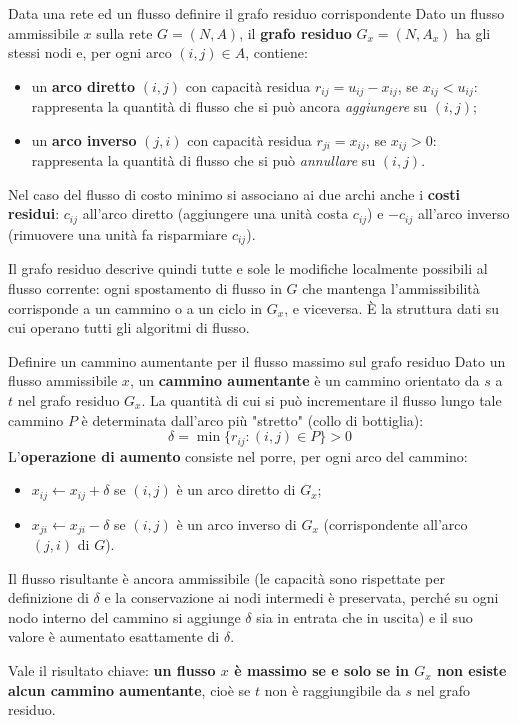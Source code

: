 \documentclass[12pt]{extarticle} %
\begin{document}
\begin{teoriabox}{Data una rete ed un flusso definire il grafo residuo corrispondente}
Dato un flusso ammissibile $x$ sulla rete $G=(N,A)$, il \textbf{grafo residuo} $G_x = (N, A_x)$ ha gli stessi nodi e, per ogni arco $(i,j) \in A$, contiene:
\begin{itemize}
    \item un \textbf{arco diretto} $(i,j)$ con capacità residua $r_{ij} = u_{ij} - x_{ij}$, se $x_{ij} < u_{ij}$: rappresenta la quantità di flusso che si può ancora \textit{aggiungere} su $(i,j)$;
    \item un \textbf{arco inverso} $(j,i)$ con capacità residua $r_{ji} = x_{ij}$, se $x_{ij} > 0$: rappresenta la quantità di flusso che si può \textit{annullare} su $(i,j)$.
\end{itemize}
Nel caso del flusso di costo minimo si associano ai due archi anche i \textbf{costi residui}: $c_{ij}$ all'arco diretto (aggiungere una unità costa $c_{ij}$) e $-c_{ij}$ all'arco inverso (rimuovere una unità fa risparmiare $c_{ij}$).

\noindent Il grafo residuo descrive quindi tutte e sole le modifiche localmente possibili al flusso corrente: ogni spostamento di flusso in $G$ che mantenga l'ammissibilità corrisponde a un cammino o a un ciclo in $G_x$, e viceversa. È la struttura dati su cui operano tutti gli algoritmi di flusso.
\end{teoriabox}

\begin{teoriabox}{Definire un cammino aumentante per il flusso massimo sul grafo residuo}
Dato un flusso ammissibile $x$, un \textbf{cammino aumentante} è un cammino orientato da $s$ a $t$ nel grafo residuo $G_x$. La quantità di cui si può incrementare il flusso lungo tale cammino $P$ è determinata dall'arco più "stretto" (collo di bottiglia):
\[
\delta = \min\{r_{ij} : (i,j) \in P\} > 0
\]
L'\textbf{operazione di aumento} consiste nel porre, per ogni arco del cammino:
\begin{itemize}
    \item $x_{ij} \leftarrow x_{ij} + \delta$ se $(i,j)$ è un arco diretto di $G_x$;
    \item $x_{ji} \leftarrow x_{ji} - \delta$ se $(i,j)$ è un arco inverso di $G_x$ (corrispondente all'arco $(j,i)$ di $G$).
\end{itemize}
Il flusso risultante è ancora ammissibile (le capacità sono rispettate per definizione di $\delta$ e la conservazione ai nodi intermedi è preservata, perché su ogni nodo interno del cammino si aggiunge $\delta$ sia in entrata che in uscita) e il suo valore è aumentato esattamente di $\delta$.

\noindent Vale il risultato chiave: \textbf{un flusso $x$ è massimo se e solo se in $G_x$ non esiste alcun cammino aumentante}, cioè se $t$ non è raggiungibile da $s$ nel grafo residuo.
\end{teoriabox}
\end{document}
